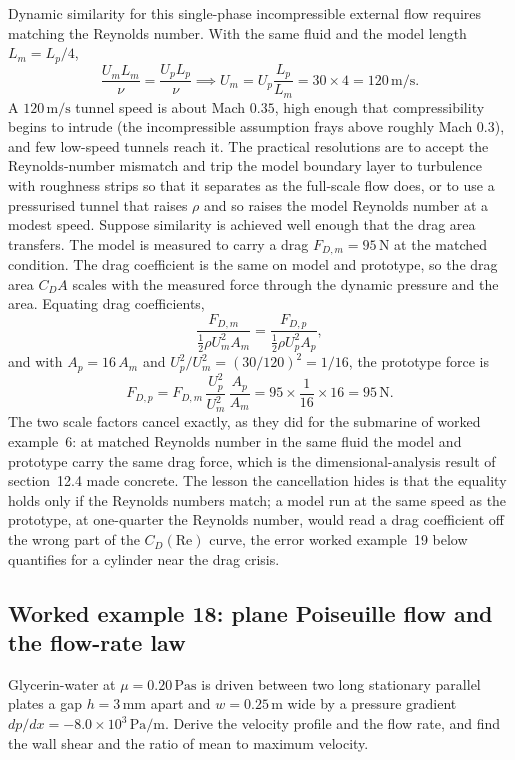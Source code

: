Dynamic similarity for this single-phase incompressible external flow
requires matching the Reynolds number. With the same fluid and the
model length $L_m = L_p/4$,
\[
\frac{U_m L_m}{\nu} = \frac{U_p L_p}{\nu} \implies U_m = U_p
\frac{L_p}{L_m} = 30\times4 = 120\,\si{\meter\per\second}.
\]
A $120\,\si{\meter\per\second}$ tunnel speed is about Mach $0.35$, high
enough that compressibility begins to intrude (the incompressible
assumption frays above roughly Mach $0.3$), and few low-speed tunnels
reach it. The practical resolutions are to accept the Reynolds-number
mismatch and trip the model boundary layer to turbulence with roughness
strips so that it separates as the full-scale flow does, or to use a
pressurised tunnel that raises $\rho$ and so raises the model Reynolds
number at a modest speed. Suppose similarity is achieved well enough
that the drag area transfers. The model is measured to carry a drag
$F_{D,m} = 95\,\si{\newton}$ at the matched condition. The drag
coefficient is the same on model and prototype, so the drag area
$C_D A$ scales with the measured force through the dynamic pressure and
the area. Equating drag coefficients,
\[
\frac{F_{D,m}}{\tfrac12\rho U_m^2 A_m} = \frac{F_{D,p}}{\tfrac12\rho
U_p^2 A_p},
\]
and with $A_p = 16\,A_m$ and $U_p^2/U_m^2 = (30/120)^2 = 1/16$, the
prototype force is
\[
F_{D,p} = F_{D,m}\,\frac{U_p^2}{U_m^2}\,\frac{A_p}{A_m} = 95\times
\frac{1}{16}\times16 = 95\,\si{\newton}.
\]
The two scale factors cancel exactly, as they did for the submarine of
worked example~6: at matched Reynolds number in the same fluid the
model and prototype carry the same drag force, which is the
dimensional-analysis result of section~12.4 made concrete. The lesson
the cancellation hides is that the equality holds only if the Reynolds
numbers match; a model run at the same speed as the prototype, at
one-quarter the Reynolds number, would read a drag coefficient off the
wrong part of the $C_D(\text{Re})$ curve, the error worked example~19
below quantifies for a cylinder near the drag crisis.

\subsection*{Worked example 18: plane Poiseuille flow and the flow-rate law}

Glycerin-water at $\mu = 0.20\,\si{\pascal\second}$ is driven between
two long stationary parallel plates a gap $h = 3\,\si{\milli\meter}$
apart and $w = 0.25\,\si{\meter}$ wide by a pressure gradient
$dp/dx = -8.0\times10^{3}\,\si{\pascal\per\meter}$. Derive the
velocity profile and the flow rate, and find the wall shear and the
ratio of mean to maximum velocity.


